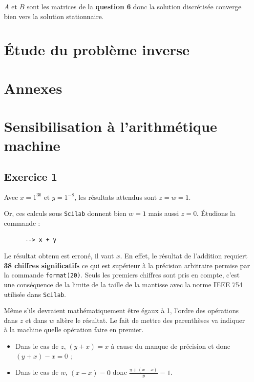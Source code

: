 \documentclass[a4paper,11pt]{article}
\theoremstyle{nonumberplain}
\theoremstyle{nonumberplain}
\theoremstyle{nonumberplain}
\begin{document}
    $A$ et $B$ sont les matrices de la \textbf{question 6} donc la solution
    discrétisée converge bien vers la solution stationnaire.

\section{\'{E}tude du problème inverse}

\section*{Annexes}

\vspace{8cm}

\section{Sensibilisation à l'arithmétique machine}
\subsection*{Exercice 1}

    Avec $x = 1^{30}$ et $y = 1^{-8}$, les résultats attendus sont $z = w = 1$.

    Or, ces calculs sous \texttt{Scilab} donnent bien $w = 1$ mais aussi $z = 0$. \'{E}tudions la commande :
    \begin{verbatim}
      --> x + y
    \end{verbatim}
    Le résultat obtenu est erroné, il vaut $x$. En effet, le résultat de l'addition requiert \textbf{38 chiffres significatifs} ce qui est supérieur à la précision arbitraire permise par la commande \texttt{format(20)}.
    Seuls les premiers chiffres sont pris en compte, c'est une conséquence de la limite de la taille de la mantisse avec la norme IEEE 754 utilisée dans \texttt{Scilab}.
    \newline

    Même s'ils devraient mathématiquement être égaux à 1, l'ordre des opérations dans $z$ et dans $w$ altère le résultat.
    Le fait de mettre des parenthèses va indiquer à la machine quelle opération faire en premier.
    \begin{itemize}
        \item Dans le cas de $z$, $(y + x) = x$ à cause du manque de précision et donc $(y + x) - x = 0$ ;
        \item Dans le cas de $w$, $(x - x) = 0$ donc $\frac{y + (x -x)}{y} = 1$.
    \end{itemize}
\end{document}
